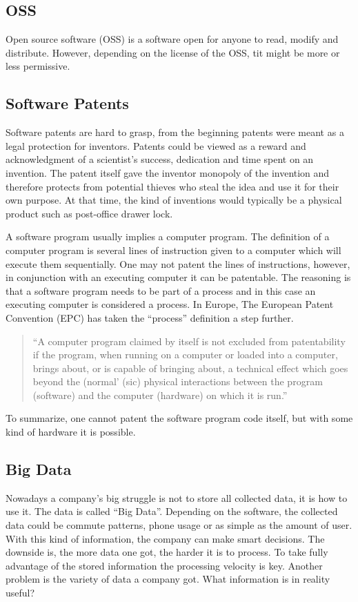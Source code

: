 \documentclass[conference]{IEEEtran}
\begin{document}
\subsection{OSS}
Open source software (OSS) is a software open for anyone to read, modify and distribute. However, depending on the license of the OSS, tit might be more or less permissive. \cite{OSS}

\subsection{Software Patents}
Software patents are hard to grasp, from the beginning patents were meant as a legal protection for inventors. Patents could be viewed as a reward and acknowledgment of a scientist's success, dedication and time spent on an invention. The patent itself gave the inventor monopoly of the invention and therefore protects from potential thieves who steal the idea and use it for their own purpose. \cite{SoftwarePatent} At that time, the kind of inventions would typically be a physical product such as post-office drawer lock. \cite{LockPatent}

A software program usually implies a computer program. The definition of a computer program is several lines of instruction given to a computer which will execute them sequentially. One may not patent the lines of instructions, however, in conjunction with an executing computer it can be patentable. The reasoning is that a software program needs to be part of a process and in this case an executing computer is considered a process. In Europe, The European Patent Convention (EPC) has taken the ``process'' definition a step further. \cite{SoftwarePatent}
\begin{quotation}
``A computer program claimed by itself is not excluded from patentability if the program, when running on a computer or loaded into a computer, brings about, or is capable of bringing about, a technical effect which goes beyond the (normal' (sic) physical interactions between the program (software) and the computer (hardware) on which it is run.'' \cite[p. 36]{SoftwarePatent}
\end{quotation} 

To summarize, one cannot patent the software program code itself, but with some kind of hardware it is possible.
\subsection{Big Data}
Nowadays a company's big struggle is not to store all collected data, it is how to use it. The data is called ``Big Data''. \cite{ExploitBigData} Depending on the software, the collected data could be commute patterns, phone usage or as simple as the amount of user. With this kind of information, the company can make smart decisions. The downside is, the more data one got, the harder it is to process. To take fully advantage of the stored information the processing velocity is key. Another problem is the variety of data a company got. What information is in reality useful? \cite{SpeedDataEco} 
\end{document}

